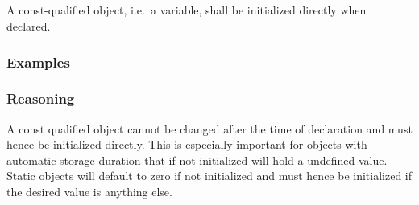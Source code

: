 \subsection*{\codingRule{}}

A const-qualified object, i.e.\ a variable, shall be initialized directly when declared.

\subsubsection*{Examples}

\noindent
\begin{minipage}[t]{\codelstwidth\linewidth}
    
\end{minipage}
\hfill
\begin{minipage}[t]{\codelstwidth\linewidth}
    
\end{minipage}

\subsubsection*{Reasoning}

A const qualified object cannot be changed after the time of declaration and must hence be initialized directly. This is especially important for objects with automatic storage duration that if not initialized will hold a undefined value. Static objects will default to zero if not initialized and must hence be initialized if the desired value is anything else.
